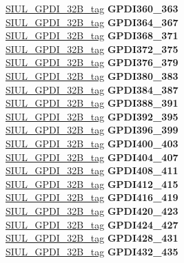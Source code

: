 \begin{DoxyCompactItemize}
\begin{tabbing}
\>\>\mbox{\hyperlink{unionSIUL__GPDI__32B__tag}{SIUL\_GPDI\_32B\_tag}} {\bfseries GPDI360\_363}\\
\>\>\mbox{\hyperlink{unionSIUL__GPDI__32B__tag}{SIUL\_GPDI\_32B\_tag}} {\bfseries GPDI364\_367}\\
\>\>\mbox{\hyperlink{unionSIUL__GPDI__32B__tag}{SIUL\_GPDI\_32B\_tag}} {\bfseries GPDI368\_371}\\
\>\>\mbox{\hyperlink{unionSIUL__GPDI__32B__tag}{SIUL\_GPDI\_32B\_tag}} {\bfseries GPDI372\_375}\\
\>\>\mbox{\hyperlink{unionSIUL__GPDI__32B__tag}{SIUL\_GPDI\_32B\_tag}} {\bfseries GPDI376\_379}\\
\>\>\mbox{\hyperlink{unionSIUL__GPDI__32B__tag}{SIUL\_GPDI\_32B\_tag}} {\bfseries GPDI380\_383}\\
\>\>\mbox{\hyperlink{unionSIUL__GPDI__32B__tag}{SIUL\_GPDI\_32B\_tag}} {\bfseries GPDI384\_387}\\
\>\>\mbox{\hyperlink{unionSIUL__GPDI__32B__tag}{SIUL\_GPDI\_32B\_tag}} {\bfseries GPDI388\_391}\\
\>\>\mbox{\hyperlink{unionSIUL__GPDI__32B__tag}{SIUL\_GPDI\_32B\_tag}} {\bfseries GPDI392\_395}\\
\>\>\mbox{\hyperlink{unionSIUL__GPDI__32B__tag}{SIUL\_GPDI\_32B\_tag}} {\bfseries GPDI396\_399}\\
\>\>\mbox{\hyperlink{unionSIUL__GPDI__32B__tag}{SIUL\_GPDI\_32B\_tag}} {\bfseries GPDI400\_403}\\
\>\>\mbox{\hyperlink{unionSIUL__GPDI__32B__tag}{SIUL\_GPDI\_32B\_tag}} {\bfseries GPDI404\_407}\\
\>\>\mbox{\hyperlink{unionSIUL__GPDI__32B__tag}{SIUL\_GPDI\_32B\_tag}} {\bfseries GPDI408\_411}\\
\>\>\mbox{\hyperlink{unionSIUL__GPDI__32B__tag}{SIUL\_GPDI\_32B\_tag}} {\bfseries GPDI412\_415}\\
\>\>\mbox{\hyperlink{unionSIUL__GPDI__32B__tag}{SIUL\_GPDI\_32B\_tag}} {\bfseries GPDI416\_419}\\
\>\>\mbox{\hyperlink{unionSIUL__GPDI__32B__tag}{SIUL\_GPDI\_32B\_tag}} {\bfseries GPDI420\_423}\\
\>\>\mbox{\hyperlink{unionSIUL__GPDI__32B__tag}{SIUL\_GPDI\_32B\_tag}} {\bfseries GPDI424\_427}\\
\>\>\mbox{\hyperlink{unionSIUL__GPDI__32B__tag}{SIUL\_GPDI\_32B\_tag}} {\bfseries GPDI428\_431}\\
\>\>\mbox{\hyperlink{unionSIUL__GPDI__32B__tag}{SIUL\_GPDI\_32B\_tag}} {\bfseries GPDI432\_435}\\

\end{tabbing}
\end{DoxyCompactItemize}
